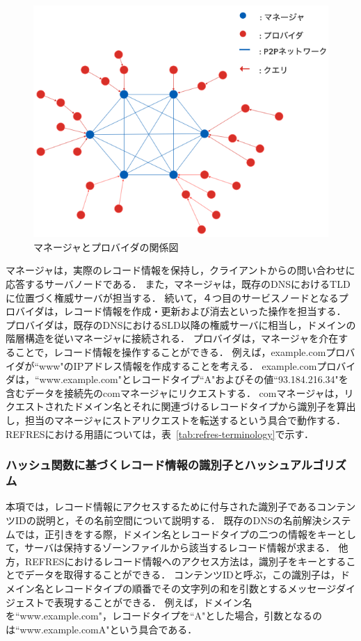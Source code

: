 \begin{figure}[bh]
 \centering
 \includegraphics[scale=0.5]{figure/manager-provider.png}
 \caption{マネージャとプロバイダの関係図}
 \label{fig:manager-provider}
\end{figure}

マネージャは，実際のレコード情報を保持し，クライアントからの問い合わせに応答するサーバノードである．
また，マネージャは，既存のDNSにおけるTLDに位置づく権威サーバが担当する．
続いて，４つ目のサービスノードとなるプロバイダは，レコード情報を作成・更新および消去といった操作を担当する．
プロバイダは，既存のDNSにおけるSLD以降の権威サーバに相当し，ドメインの階層構造を従いマネージャに接続される．
プロバイダは，マネージャを介在することで，レコード情報を操作することができる．
例えば，example.comプロバイダが``www"のIPアドレス情報を作成することを考える．
example.comプロバイダは，``www.example.com"とレコードタイプ``A"およびその値``93.184.216.34"を含むデータを接続先のcomマネージャにリクエストする．
comマネージャは，リクエストされたドメイン名とそれに関連づけるレコードタイプから識別子を算出し，担当のマネージャにストアリクエストを転送するという具合で動作する．
REFRESにおける用語については，表~\ref{tab:refres-terminology}で示す．


\subsubsection{ハッシュ関数に基づくレコード情報の識別子とハッシュアルゴリズム}
本項では，レコード情報にアクセスするために付与された識別子であるコンテンツIDの説明と，その名前空間について説明する．
既存のDNSの名前解決システムでは，正引きをする際，ドメイン名とレコードタイプの二つの情報をキーとして，サーバは保持するゾーンファイルから該当するレコード情報が求まる．
他方，REFRESにおけるレコード情報へのアクセス方法は，識別子をキーとすることでデータを取得することができる．
コンテンツIDと呼ぶ，この識別子は，ドメイン名とレコードタイプの順番でその文字列の和を引数とするメッセージダイジェストで表現することができる．
例えば，ドメイン名を``www.example.com"，レコードタイプを``A"とした場合，引数となるのは``www.example.comA"という具合である．

